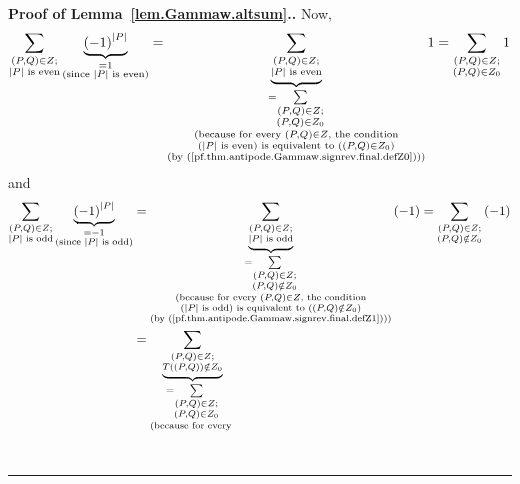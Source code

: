 \documentclass[numbers=enddot,12pt,final,onecolumn,notitlepage,abstracton]{scrartcl}
\theoremstyle{definition}
\newenvironment{proof}[1][Proof]{\noindent\textbf{#1.} }{\ \rule{0.5em}{0.5em}}
\let\sumnonlimits\sum
\renewcommand{\sum}{\sumnonlimits\limits}
\newenvironment{verlong}{}{}
\begin{document}
\begin{proof}[Proof of Lemma~\ref{lem.Gammaw.altsum}.]
\begin{verlong}
{Now,
\[
\sum_{\substack{\left(  P,Q\right)  \in Z;\\\left\vert P\right\vert \text{ is
even}}}\underbrace{\left(  -1\right)  ^{\left\vert P\right\vert }%
}_{\substack{=1\\\text{(since }\left\vert P\right\vert \text{ is even)}%
}}=\underbrace{\sum_{\substack{\left(  P,Q\right)  \in Z;\\\left\vert
P\right\vert \text{ is even}}}}_{\substack{=\sum_{\substack{\left(
P,Q\right)  \in Z;\\\left(  P,Q\right)  \in Z_{0}}}\\\text{(because for every
}\left(  P,Q\right)  \in Z\text{, the condition}\\\left(  \left\vert
P\right\vert \text{ is even}\right)  \text{ is equivalent to }\left(  \left(
P,Q\right)  \in Z_{0}\right)  \\\text{(by
(\ref{pf.thm.antipode.Gammaw.signrev.final.defZ0})))}}}1=\sum
_{\substack{\left(  P,Q\right)  \in Z;\\\left(  P,Q\right)  \in Z_{0}}}1
\]
and%
\begin{align*}
\sum_{\substack{\left(  P,Q\right)  \in Z;\\\left\vert P\right\vert \text{ is
odd}}}\underbrace{\left(  -1\right)  ^{\left\vert P\right\vert }%
}_{\substack{=-1\\\text{(since }\left\vert P\right\vert \text{ is odd)}}}  &
=\underbrace{\sum_{\substack{\left(  P,Q\right)  \in Z;\\\left\vert
P\right\vert \text{ is odd}}}}_{\substack{=\sum_{\substack{\left(  P,Q\right)
\in Z;\\\left(  P,Q\right)  \notin Z_{0}}}\\\text{(because for every }\left(
P,Q\right)  \in Z\text{, the condition}\\\left(  \left\vert P\right\vert
\text{ is odd}\right)  \text{ is equivalent to }\left(  \left(  P,Q\right)
\notin Z_{0}\right)  \\\text{(by
(\ref{pf.thm.antipode.Gammaw.signrev.final.defZ1})))}}}\left(  -1\right)
=\sum_{\substack{\left(  P,Q\right)  \in Z;\\\left(  P,Q\right)  \notin Z_{0}%
}}\left(  -1\right)  \\
& =\underbrace{\sum_{\substack{\left(  P,Q\right)  \in Z;\\T\left(  \left(
P,Q\right)  \right)  \notin Z_{0}}}}_{\substack{=\sum_{\substack{\left(
P,Q\right)  \in Z;\\\left(  P,Q\right)  \in Z_{0}}}\\\text{(because for every
}}}
\end{align*}}
\end{verlong}
\end{proof}
\end{document}
